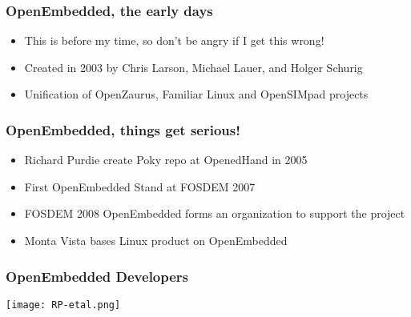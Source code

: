 \documentclass{beamer}
\begin{document}
\begin{frame}
\frametitle{OpenEmbedded, the early days}


	\begin{itemize}
		\item This is before my time, so don't be angry if I get this wrong!
		\item Created in 2003 by Chris Larson, Michael Lauer, and Holger Schurig
		\item Unification of OpenZaurus, Familiar Linux and OpenSIMpad projects
	\end{itemize}

\end{frame}

\begin{frame}
\frametitle{OpenEmbedded, things get serious! }

\begin{itemize}
\item Richard Purdie create Poky repo at OpenedHand in 2005
\item First OpenEmbedded Stand at FOSDEM 2007
\item FOSDEM 2008 OpenEmbedded forms an organization to support the project
\item Monta Vista bases Linux product on OpenEmbedded
\end{itemize}

\end{frame}

\begin{frame}
	\frametitle{OpenEmbedded Developers}

\begin{center}
\texttt{[image: RP-etal.png]}
\end{center}

\end{frame}
\end{document}

